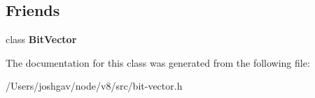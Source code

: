\subsection*{Friends}
\begin{DoxyCompactItemize}
\item 
class {\bfseries Bit\+Vector}\hypertarget{classv8_1_1internal_1_1_bit_vector_1_1_b_a_s_e___e_m_b_e_d_d_e_d_a36e8ce805d9208092c1351bd2d513e2d}{}\label{classv8_1_1internal_1_1_bit_vector_1_1_b_a_s_e___e_m_b_e_d_d_e_d_a36e8ce805d9208092c1351bd2d513e2d}

\end{DoxyCompactItemize}


The documentation for this class was generated from the following file\+:\begin{DoxyCompactItemize}
\item 
/\+Users/joshgav/node/v8/src/bit-\/vector.\+h\end{DoxyCompactItemize}
